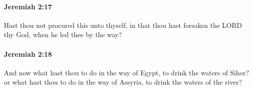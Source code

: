 		\paragraph{Jeremiah 2:17} %
			\label{JEREMIAH-2-17}

			Hast thou not procured this unto thyself, in that thou hast forsaken the LORD thy God, when he led thee by the way?


		\paragraph{Jeremiah 2:18} %
			\label{JEREMIAH-2-18}

			And now what hast thou to do in the way of Egypt, to drink the waters of Sihor? or what hast thou to do in the way of Assyria, to drink the waters of the river?


